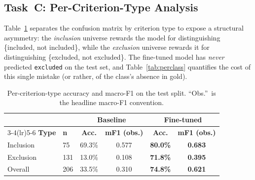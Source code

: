 \documentclass[conference]{IEEEtran}
\newcommand{\code}[1]{\texttt{\small #1}}
\begin{document}
\subsection{Task~C: Per-Criterion-Type Analysis}
\label{sec:perclass}

Table~\ref{tab:cmincexc} separates the confusion matrix by
criterion type to expose a structural asymmetry: the
\emph{inclusion} universe rewards the model for distinguishing
\{included, not included\}, while the \emph{exclusion} universe
rewards it for distinguishing \{excluded, not excluded\}. The
fine-tuned model has \emph{never} predicted \code{excluded} on
the test set, and Table~\ref{tab:perclass} quantifies the cost of
this single mistake (or rather, of the class's absence in gold).

\begin{table}[t]
\caption{Per-criterion-type accuracy and macro-F1 on the test split.
``Obs.''\ is the headline macro-F1 convention.}
\label{tab:cmincexc}
\centering
\small
\begin{tabular}{llcccc}
\toprule
& & \multicolumn{2}{c}{\textbf{Baseline}} &
\multicolumn{2}{c}{\textbf{Fine-tuned}} \\
\cmidrule(lr){3-4}\cmidrule(lr){5-6}
\textbf{Type} & \textbf{n} & \textbf{Acc.} & \textbf{mF1 (obs.)} &
\textbf{Acc.} & \textbf{mF1 (obs.)} \\
\midrule
Inclusion & 75 & 69.3\% & 0.577 & \textbf{80.0\%} & \textbf{0.683}\\
Exclusion & 131 & 13.0\% & 0.108 & \textbf{71.8\%} & \textbf{0.395}\\
\midrule
Overall & 206 & 33.5\% & 0.310 & \textbf{74.8\%} & \textbf{0.621}\\
\bottomrule
\end{tabular}
\end{table}
\end{document}
